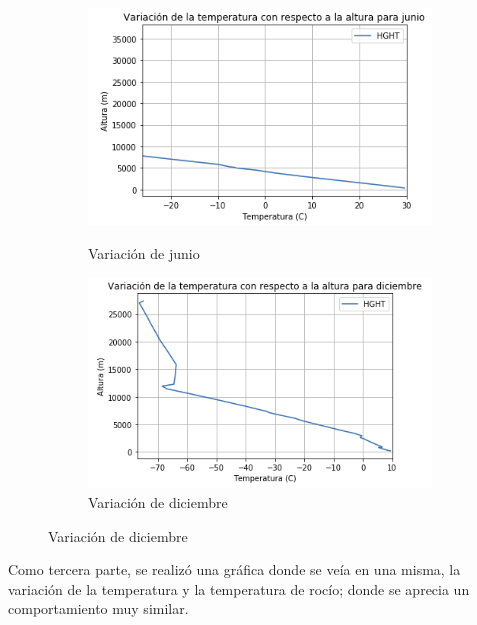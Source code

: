 \documentclass{article}
\begin{document}
\begin{figure}[h!]
\begin{subfigure}{.30\textwidth}
  \
  \includegraphics[width=.8\linewidth]{temp1.png}
  \caption{Variación de junio}
  \label{fig:sfig1}
\end{subfigure}
\begin{subfigure}{.30\textwidth}
  \left
  \includegraphics[width=.8\linewidth]{temp2.png}
  \caption{Variación de diciembre}
  \label{fig:sfig2}
\end{subfigure}
\end{figure}

Como tercera parte, se realizó una gráfica donde se veía en una misma, la variación de la temperatura y la temperatura de rocío; donde se aprecia un comportamiento muy similar.

\newpage
\end{document}
